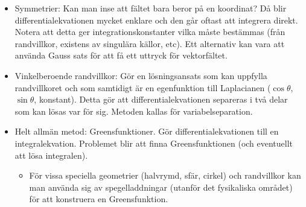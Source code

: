 \documentclass[%
oneside,                 %
final,                   %
10pt]{article}
\begin{document}
\begin{itemize}
  \item Symmetrier: Kan man inse att fältet bara beror på en koordinat? Då blir differentialekvationen mycket enklare och den går oftast att integrera direkt. Notera att detta ger integrationskonstanter vilka måste bestämmas (från randvillkor, existens av singulära källor, etc). Ett alternativ kan vara att använda Gauss sats för att få ett uttryck för vektorfältet.

  \item Vinkelberoende randvillkor: Gör en lösningsansats som kan uppfylla randvillkoret och som samtidigt är en egenfunktion till Laplacianen ($\cos\theta$, $\sin\theta$, konstant). Detta gör att differentialekvationen separeras i två delar som kan lösas var för sig. Metoden kallas för variabelseparation.

  \item Helt allmän metod: Greensfunktioner. Gör differentialekvationen till en integralekvation. Problemet blir att finna Greensfunktionen (och eventuellt att lösa integralen).
\begin{itemize}

    \item För vissa speciella geometrier (halvrymd, sfär, cirkel) och randvillkor kan man använda sig av spegelladdningar (utanför det fysikaliska området) för att konstruera en Greensfunktion. 
\end{itemize}

\noindent
\end{itemize}

\noindent



\printindex
\end{document}
